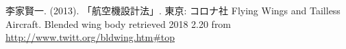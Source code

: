 \documentclass[class=article, crop=false, dvipdfmx, fleqn]{standalone}
\begin{document}
\begin{thebibliography}{2}
 李家賢一. (2013). 「航空機設計法」. 東京: コロナ社
 Flying Wings and Tailless Aircraft. Blended wing body
retrieved 2018 2.20 from \url{http://www.twitt.org/bldwing.htm#top}
\end{thebibliography}
\end{document}
